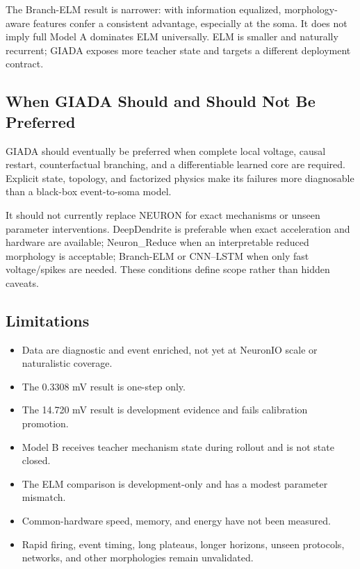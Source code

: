 \documentclass[11pt]{article}
\begin{document}
The Branch-ELM result is narrower: with information equalized,
morphology-aware features confer a consistent advantage, especially at the
soma. It does not imply full Model A dominates ELM universally. ELM is smaller
and naturally recurrent; GIADA exposes more teacher state and targets a
different deployment contract.

\subsection{When GIADA Should and Should Not Be Preferred}

GIADA should eventually be preferred when complete local voltage, causal
restart, counterfactual branching, and a differentiable learned core are
required. Explicit state, topology, and factorized physics make its failures
more diagnosable than a black-box event-to-soma model.

It should not currently replace NEURON for exact mechanisms or unseen parameter
interventions. DeepDendrite is preferable when exact acceleration and hardware
are available; Neuron\_Reduce when an interpretable reduced morphology is
acceptable; Branch-ELM or CNN--LSTM when only fast voltage/spikes are needed.
These conditions define scope rather than hidden caveats.

\subsection{Limitations}

\begin{itemize}
  \item Data are diagnostic and event enriched, not yet at NeuronIO scale or
  naturalistic coverage.
  \item The 0.3308 mV result is one-step only.
  \item The 14.720 mV result is development evidence and fails calibration
  promotion.
  \item Model B receives teacher mechanism state during rollout and is not
  state closed.
  \item The ELM comparison is development-only and has a modest parameter
  mismatch.
  \item Common-hardware speed, memory, and energy have not been measured.
  \item Rapid firing, event timing, long plateaus, longer horizons, unseen
  protocols, networks, and other morphologies remain unvalidated.
\end{itemize}
\end{document}
